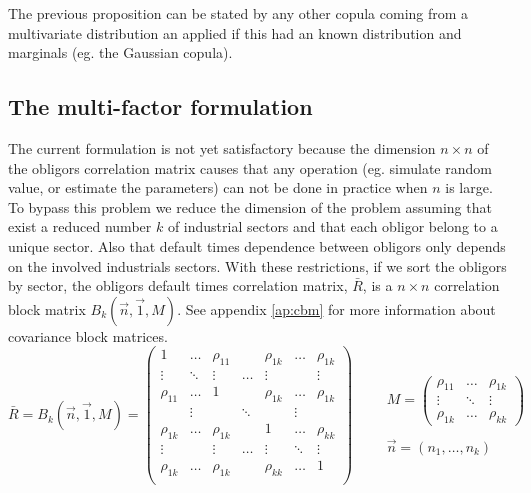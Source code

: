 \documentclass[11pt,fleqn]{book} %
\begin{document}
The previous proposition can be stated by any other copula coming from
a multivariate distribution an applied if this had an known distribution 
and marginals (eg. the Gaussian copula).

\subsection{The multi-factor formulation}

The current formulation is not yet satisfactory because the dimension 
$n {\times} n$ of the obligors correlation matrix causes that any 
operation (eg. simulate random value, or estimate the parameters) can 
not be done in practice when $n$ is large. To bypass this problem we
reduce the dimension of the problem assuming that exist a reduced number 
$k$ of industrial sectors and that each obligor belong to a unique sector. 
Also that default times dependence between obligors only depends on the 
involved industrials sectors. With these restrictions, if we sort the 
obligors by sector, the obligors default times correlation matrix, $\bar{R}$, 
is a $n {\times} n$ correlation block matrix $B_k(\vec{n},\vec{1},M)$. See 
appendix \ref{ap:cbm} for more information about covariance block matrices. 
\begin{displaymath}
	\bar{R} = B_k(\vec{n},\vec{1},M) = 
	\left(
	\begin{array}{ccccccc}
		1         & \dots  & \rho_{11} &        & \rho_{1k} & \dots  & \rho_{1k} \\
		\vdots    & \ddots & \vdots    & \dots  & \vdots    &        & \vdots    \\
		\rho_{11} & \dots  & 1         &        & \rho_{1k} & \dots  & \rho_{1k} \\
		
		          & \vdots &           & \ddots &           & \vdots &           \\
		
		\rho_{1k} & \dots  & \rho_{1k} &        & 1         & \dots  & \rho_{kk} \\
		\vdots    &        & \vdots    & \dots  & \vdots    & \ddots & \vdots    \\
		\rho_{1k} & \dots  & \rho_{1k} &        & \rho_{kk} & \dots  & 1         \\
	\end{array}
	\right)
	\qquad 
	\begin{array}{l}
		M = 
		\left(
		\begin{array}{ccc}
		\rho_{11} & \dots  & \rho_{1k} \\
		\vdots    & \ddots & \vdots    \\
		\rho_{1k} & \dots  & \rho_{kk}
		\end{array}
		\right) \\
		\\
		\vec{n} = (n_1,\dots,n_k)
	\end{array}
\end{displaymath}
\end{document}

